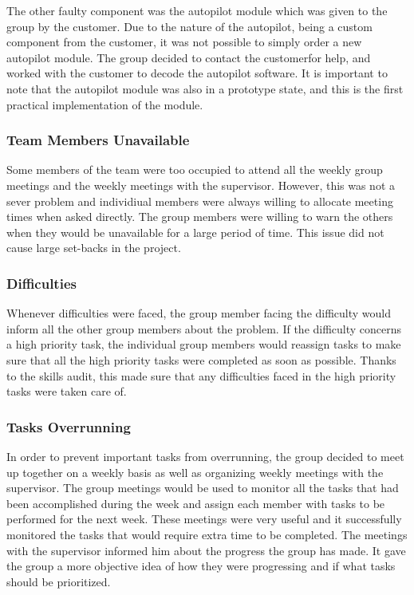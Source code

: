 The other faulty component was the autopilot module which was given to the group by the customer. 
Due to the nature of the autopilot, being a custom component from the customer, it was not possible to simply order a new autopilot module. 
The group decided to contact the customerfor help, and worked with the customer to decode the autopilot software. 
It is important to note that the autopilot module was also in a prototype state, and this is the first practical implementation of the module.

\subsubsection*{Team Members Unavailable}
Some members of the team were too occupied to attend all the weekly group meetings and the weekly meetings with the supervisor. 
However, this was not a sever problem and individiual members were always willing to allocate meeting times when asked directly. 
The group members were willing to warn the others when they would be unavailable for a large period of time. 
This issue did not cause large set-backs in the project.

\subsubsection*{Difficulties}
Whenever difficulties were faced, the group member facing the difficulty would inform all the other group members about the problem. 
If the difficulty concerns a high priority task, the individual group members would reassign tasks to make sure that all the high priority 
tasks were completed as soon as possible. Thanks to the skills audit, this made sure that 
any difficulties faced in the high priority tasks were taken care of.

\subsubsection*{Tasks Overrunning}
In order to prevent important tasks from overrunning, the group decided to meet up together on a 
weekly basis as well as organizing weekly meetings with the supervisor. 
The group meetings would be used to monitor all the tasks that had been accomplished during the week and 
assign each member with tasks to be performed for the next week. 
These meetings were very useful and it successfully monitored the tasks that would require extra time to be completed. 
The meetings with the supervisor informed him about the progress the group has made. 
It gave the group a more objective idea of how they were progressing and if what tasks should be prioritized.
